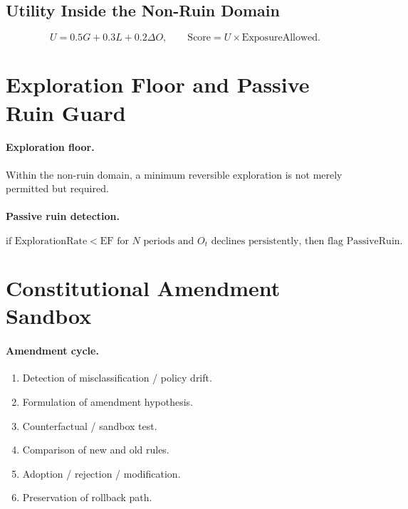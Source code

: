 \subsection{Utility Inside the Non-Ruin Domain}
\label{sec:omega-utility}

\begin{equation}
U = 0.5 G + 0.3 L + 0.2 \Delta O,
\qquad
\mathrm{Score} = U \times \mathrm{ExposureAllowed}.
\label{eq:omega-utility}
\end{equation}

\section{Exploration Floor and Passive Ruin Guard}
\label{sec:omega-exploration-floor}

\paragraph{Exploration floor.}
Within the non-ruin domain, a minimum reversible exploration is not
merely permitted but required.

\paragraph{Passive ruin detection.}

\begin{equation}
\text{if } \mathrm{ExplorationRate} < \mathrm{EF} \text{ for } N
\text{ periods and } O_t \text{ declines persistently, then flag
PassiveRuin.}
\label{eq:omega-passive-detection}
\end{equation}

\section{Constitutional Amendment Sandbox}
\label{sec:omega-amendment-sandbox}

\paragraph{Amendment cycle.}

\begin{enumerate}
\item Detection of misclassification / policy drift.
\item Formulation of amendment hypothesis.
\item Counterfactual / sandbox test.
\item Comparison of new and old rules.
\item Adoption / rejection / modification.
\item Preservation of rollback path.
\end{enumerate}

